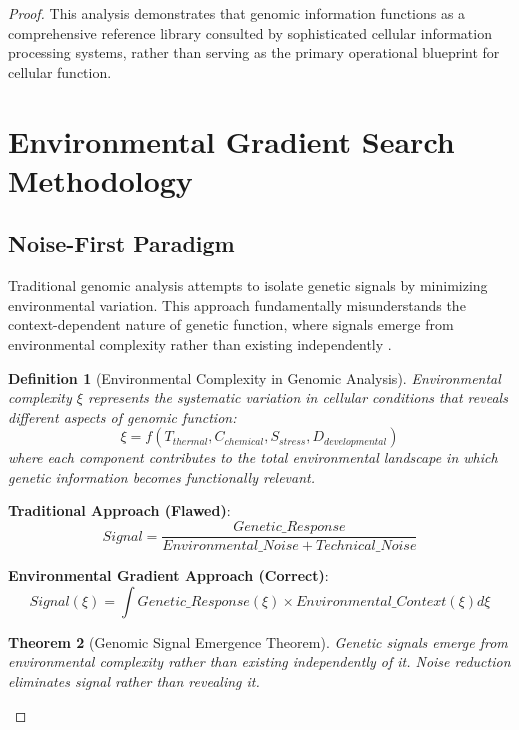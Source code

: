 \documentclass[12pt,a4paper]{article}
\newtheorem{theorem}{Theorem}[section]
\newtheorem{definition}[theorem]{Definition}
\begin{document}
\begin{proof}
This analysis demonstrates that genomic information functions as a comprehensive reference library consulted by sophisticated cellular information processing systems, rather than serving as the primary operational blueprint for cellular function.

\section{Environmental Gradient Search Methodology}

\subsection{Noise-First Paradigm}

Traditional genomic analysis attempts to isolate genetic signals by minimizing environmental variation. This approach fundamentally misunderstands the context-dependent nature of genetic function, where signals emerge from environmental complexity rather than existing independently \cite{dunn2011procedures, creek2014metabolome}.

\begin{definition}[Environmental Complexity in Genomic Analysis]
Environmental complexity $\xi$ represents the systematic variation in cellular conditions that reveals different aspects of genomic function:
\begin{equation}
\xi = f(T_{thermal}, C_{chemical}, S_{stress}, D_{developmental})
\end{equation}
where each component contributes to the total environmental landscape in which genetic information becomes functionally relevant.
\end{definition}

\textbf{Traditional Approach (Flawed)}:
\begin{equation}
Signal = \frac{Genetic\_Response}{Environmental\_Noise + Technical\_Noise}
\end{equation}

\textbf{Environmental Gradient Approach (Correct)}:
\begin{equation}
Signal(\xi) = \int Genetic\_Response(\xi) \times Environmental\_Context(\xi) d\xi
\end{equation}

\begin{theorem}[Genomic Signal Emergence Theorem]
Genetic signals emerge from environmental complexity rather than existing independently of it. Noise reduction eliminates signal rather than revealing it.
\end{theorem}


\end{proof}
\end{document}
